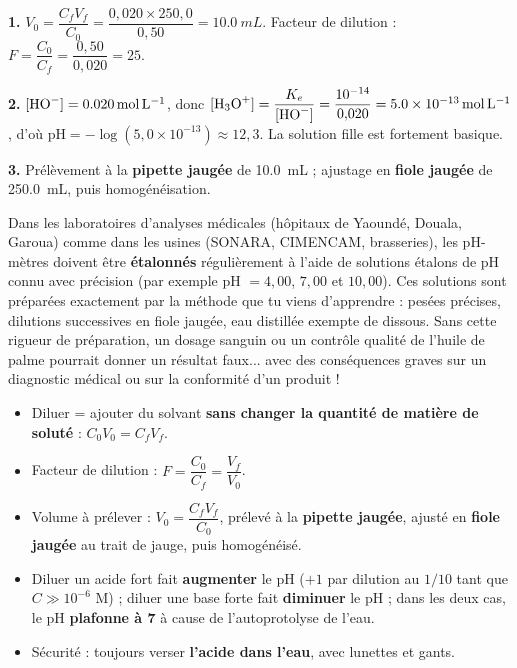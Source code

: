 \documentclass[11pt]{article}
\newcommand{\cle}[1]{{\popxbold\color{popdark}#1}}
\begin{document}
\begin{corrige}
\textbf{1.} $V_0 = \dfrac{C_f V_f}{C_0} = \dfrac{0{,}020 \times 250{,}0}{0{,}50} = \SI{10,0}{mL}$. Facteur de dilution : $F = \dfrac{C_0}{C_f} = \dfrac{0{,}50}{0{,}020} = 25$.

\textbf{2.} $[\ce{HO-}] = \SI{0,020}{mol.L^{-1}}$, donc $[\ce{H3O+}] = \dfrac{K_e}{[\ce{HO-}]} = \dfrac{10^{-14}}{0{,}020} = \SI{5,0e-13}{mol.L^{-1}}$, d'où $\text{pH} = -\log(5{,}0 \times 10^{-13}) \approx 12{,}3$. La solution fille est fortement basique.

\textbf{3.} Prélèvement à la \textbf{pipette jaugée} de \SI{10,0}{mL} ; ajustage en \textbf{fiole jaugée} de \SI{250,0}{mL}, puis homogénéisation.
\end{corrige}

\begin{savaistu}
Dans les laboratoires d'analyses médicales (hôpitaux de Yaoundé, Douala, Garoua) comme dans les usines (SONARA, CIMENCAM, brasseries), les pH-mètres doivent être \textbf{étalonnés} régulièrement à l'aide de \cle{solutions étalons} de pH connu avec précision (par exemple pH $= 4{,}00$, $7{,}00$ et $10{,}00$). Ces solutions sont préparées exactement par la méthode que tu viens d'apprendre : pesées précises, dilutions successives en fiole jaugée, eau distillée exempte de  dissous. Sans cette rigueur de préparation, un dosage sanguin ou un contrôle qualité de l'huile de palme pourrait donner un résultat faux... avec des conséquences graves sur un diagnostic médical ou sur la conformité d'un produit !
\end{savaistu}

\begin{aretenir}
\begin{itemize}
\item Diluer = ajouter du solvant \textbf{sans changer la quantité de matière de soluté} : $C_0 V_0 = C_f V_f$.
\item Facteur de dilution : $F = \dfrac{C_0}{C_f} = \dfrac{V_f}{V_0}$.
\item Volume à prélever : $V_0 = \dfrac{C_f V_f}{C_0}$, prélevé à la \textbf{pipette jaugée}, ajusté en \textbf{fiole jaugée} au trait de jauge, puis homogénéisé.
\item Diluer un acide fort fait \textbf{augmenter} le pH ($+1$ par dilution au $1/10$ tant que $C \gg 10^{-6}$ M) ; diluer une base forte fait \textbf{diminuer} le pH ; dans les deux cas, le pH \textbf{plafonne à 7} à cause de l'autoprotolyse de l'eau.
\item Sécurité : toujours verser \textbf{l'acide dans l'eau}, avec lunettes et gants.
\end{itemize}
\end{aretenir}
\end{document}
